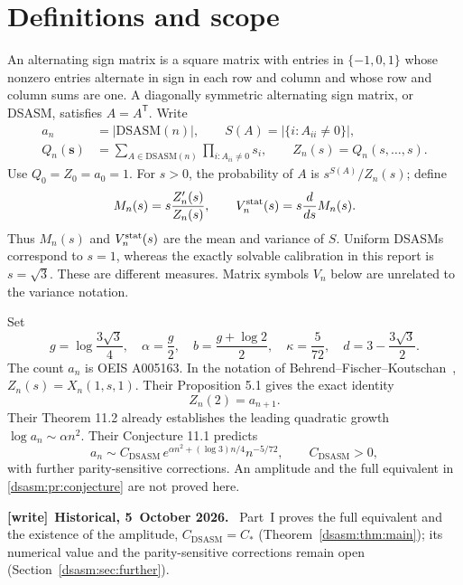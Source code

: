 \documentclass[11pt,letterpaper]{article}
\theoremstyle{remark}\newtheorem{remark}[theorem]{Remark}
\newcommand{\DS}{\mathrm{DSASM}}\newcommand{\ASM}{\mathrm{ASM}}
\newenvironment{writenote}[1][]{\par\smallskip\begingroup\small
 \noindent\textbf{[write]}\if\relax\detokenize{#1}\relax\else~\textbf{#1.}\fi\ }%
 {\par\endgroup\smallskip}
\begin{document}
\section{Definitions and scope}\label{dsasm:pr:sec:main}

An alternating sign matrix is a square matrix with entries in
$\{-1,0,1\}$ whose nonzero entries alternate in sign in each row and
column and whose row and column sums are one. A diagonally symmetric
alternating sign matrix, or DSASM, satisfies $A=A^{\mathsf T}$.
Write
\begin{equation}\label{dsasm:pr:def}
\begin{split}
a_n&=|\DS(n)|,\qquad S(A)=|\{i:A_{ii}\ne0\}|,\\
Q_n(\mathbf s)&=\sum_{A\in\DS(n)}\prod_{i:A_{ii}\ne0}s_i,
\qquad Z_n(s)=Q_n(s,\ldots,s).
\end{split}
\end{equation}
Use $Q_0=Z_0=a_0=1$. For $s>0$, the probability of $A$ is
$s^{S(A)}/Z_n(s)$; define
\begin{equation}\label{dsasm:pr:meanvar}
M_n(s)=s\frac{Z_n'(s)}{Z_n(s)},\qquad
V_n^{\rm stat}(s)=s\frac{d}{ds}M_n(s).
\end{equation}
Thus $M_n(s)$ and $V_n^{\rm stat}(s)$ are the mean and variance of $S$.
Uniform DSASMs correspond to $s=1$, whereas the exactly solvable
calibration in this report is $s=\sqrt3$. These are different measures.
Matrix symbols $V_n$ below are unrelated to the variance notation.

Set
\begin{equation}\label{dsasm:pr:constants}
 g=\log\frac{3\sqrt3}{4},\quad \alpha=\frac g2,\quad
 b=\frac{g+\log2}{2},\quad \kappa=\frac5{72},\quad
 d=3-\frac{3\sqrt3}{2}.
\end{equation}
The count $a_n$ is OEIS A005163. In the notation of
Behrend--Fischer--Koutschan~\cite{bfk}, $Z_n(s)=X_n(1,s,1)$.
Their Proposition 5.1 gives the exact identity
\begin{equation}\label{dsasm:pr:adjacentcount} Z_n(2)=a_{n+1}.\end{equation}
Their Theorem 11.2 already establishes the leading quadratic growth
$\log a_n\sim\alpha n^2$. Their Conjecture 11.1 predicts
\begin{equation}\label{dsasm:pr:conjecture}
a_n\sim C_{\DS}\,e^{\alpha n^2+(\log3)n/4}n^{-5/72},\qquad C_{\DS}>0,
\end{equation}
with further parity-sensitive corrections. An amplitude and the full
equivalent in \eqref{dsasm:pr:conjecture} are not proved here.
\begin{writenote}[Historical, 5~October 2026]
Part~I proves the full equivalent and the existence of the amplitude, $C_{\DS}=C_*$ (Theorem~\ref{dsasm:thm:main}); its numerical value and the parity-sensitive corrections remain open (Section~\ref{dsasm:sec:further}).
\end{writenote}
\end{document}
